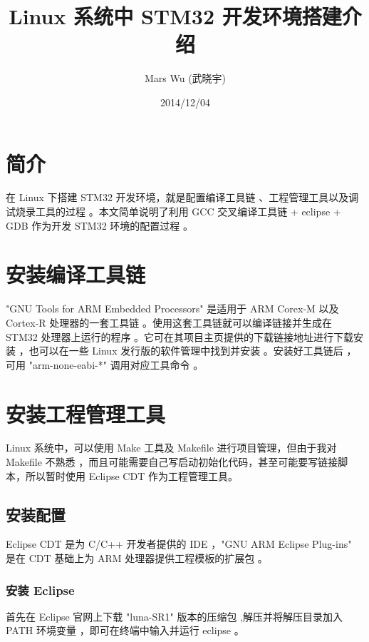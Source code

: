 \documentclass{article}
\begin{document}
\title{Linux 系统中 STM32 开发环境搭建介绍}
\author{Mars Wu (武晓宇)}
\date{2014/12/04}
\maketitle

\section{简介}
\label{sec:简介}

在 Linux 下搭建 STM32 开发环境，就是配置编译工具链 、工程管理工具以及调试烧录工具的过程 。本文简单说明了利用 GCC 交叉编译工具链 + eclipse + GDB 作为开发 STM32 环境的配置过程 。
\section{安装编译工具链}
\label{sec:编译工具链}

"GNU Tools for ARM Embedded Processors"\cite{gcc-arm-embedded} 是适用于 ARM Corex-M 以及 Cortex-R 处理器的一套工具链 。使用这套工具链就可以编译链接并生成在 STM32 处理器上运行的程序 。它可在其项目主页提供的下载链接地址\cite{gcc-arm-embedded+download}进行下载安装 ，也可以在一些 Linux 发行版的软件管理中找到并安装 。安装好工具链后 ，可用  "arm-none-eabi-*" 调用对应工具命令 。

\section{安装工程管理工具}
\label{sec:工程管理工具}

Linux 系统中，可以使用 Make 工具及 Makefile 进行项目管理，但由于我对 Makefile 不熟悉 ，而且可能需要自己写启动初始化代码，甚至可能要写链接脚本，所以暂时使用 Eclipse CDT 作为工程管理工具。

\subsection{安装配置}
\label{sec:安装配置}

Eclipse CDT 是为 C/C++ 开发者提供的 IDE ，"GNU ARM Eclipse Plug-ins"\cite{CDT-ARM} 是在 CDT 基础上为 ARM 处理器提供工程模板的扩展包 。

\subsubsection{安装 Eclipse}
\label{sec:安装eclipse}

首先在 Eclipse 官网上下载 "luna-SR1" 版本的压缩包\cite{eclipse-download} ,解压并将解压目录加入 PATH 环境变量 ，即可在终端中输入并运行 eclipse 。
\end{document}
